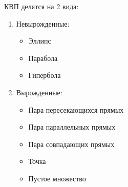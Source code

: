 КВП делятся на 2 вида:
\begin{enumerate}
    \item Невырожденные:
          \begin{itemize}
              \item Эллипс
              \item Парабола
              \item Гипербола
          \end{itemize}
    \item Вырожденные:
          \begin{itemize}
              \item Пара пересекающихся прямых
              \item Пара параллельных прямых
              \item Пара совпадающих прямых
              \item Точка
              \item Пустое множество
          \end{itemize}
\end{enumerate}


